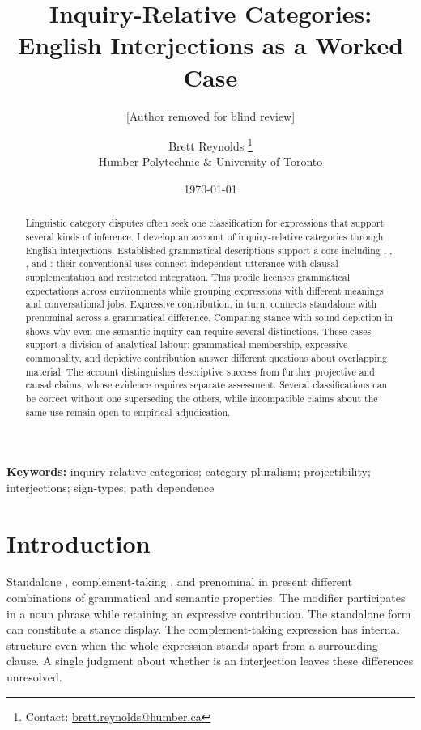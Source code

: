 \documentclass[12pt]{article}
\title{Inquiry-Relative Categories:\\English Interjections as a Worked Case}
\author{[Author removed for blind review]}
\author{Brett Reynolds \orcidlink{0000-0003-0073-7195}%
\thanks{Contact: \href{mailto:brett.reynolds@humber.ca}{brett.reynolds@humber.ca}}\\
Humber Polytechnic \& University of Toronto}
\date{\today}
\begin{document}
\maketitle

\begin{abstract}
Linguistic category disputes often seek one classification for expressions
that support several kinds of inference. I develop an account of
inquiry-relative categories through English interjections. Established
grammatical descriptions support a core including ,
, , and : their conventional uses
connect independent utterance with clausal supplementation and restricted
integration. This profile licenses grammatical expectations across
environments while grouping expressions with different meanings and
conversational jobs. Expressive contribution, in turn, connects standalone
 with prenominal  across a grammatical
difference. Comparing stance with sound depiction in 
shows why even one semantic inquiry can require several distinctions.
These cases support a division of analytical labour: grammatical
membership, expressive commonality, and depictive contribution answer
different questions about overlapping material. The account distinguishes
descriptive success from further projective and causal claims, whose
evidence requires separate assessment. Several classifications can
be correct without one superseding the others, while incompatible claims
about the same use remain open to empirical adjudication.
\end{abstract}

\noindent\textbf{Keywords:} inquiry-relative categories; category pluralism;
projectibility; interjections; sign-types; path dependence


\section{Introduction}\label{sec:intro}

Standalone , complement-taking ,
and prenominal  in  present different
combinations of grammatical and semantic properties. The modifier participates
in a noun phrase while retaining an expressive contribution. The standalone
form can constitute a stance display. The complement-taking expression has
internal structure even when the whole expression stands apart from a
surrounding clause. A single judgment about whether  is an
interjection leaves these differences unresolved.
\end{document}
